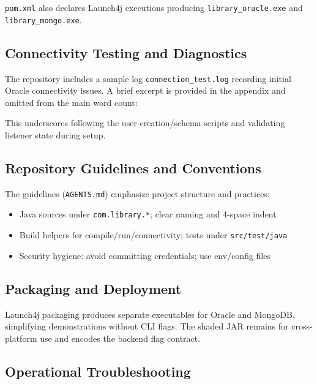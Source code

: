 \documentclass[12pt,a4paper]{article}
\newcommand{\code}[1]{\texttt{#1}}
\newcommand{\file}[1]{\texttt{#1}}
\begin{document}
\file{pom.xml} also declares Launch4j executions producing \code{library\_oracle.exe} and \code{library\_mongo.exe}.

\subsection{Connectivity Testing and Diagnostics}

The repository includes a sample log \file{connection\_test.log} recording initial Oracle connectivity issues. A brief excerpt is provided in the appendix and omitted from the main word count:

\begin{comment}
\begin{lstlisting}[style=java, caption=Oracle connectivity diagnostics]
ERROR:
ORA-01017: invalid username/password; logon denied

ERROR:
ORA-01005: null password given; logon denied
\end{lstlisting}
\end{comment}

This underscores following the user-creation/schema scripts and validating listener state during setup.

\subsection{Repository Guidelines and Conventions}

The guidelines (\file{AGENTS.md}) emphasize project structure and practices:
\begin{itemize}
    \item Java sources under \code{com.library.*}; clear naming and 4-space indent
    \item Build helpers for compile/run/connectivity; tests under \code{src/test/java}
    \item Security hygiene: avoid committing credentials; use env/config files
\end{itemize}

\subsection{Packaging and Deployment}

Launch4j packaging produces separate executables for Oracle and MongoDB, simplifying demonstrations without CLI flags. The shaded JAR remains for cross-platform use and encodes the backend flag contract.

\subsection{Operational Troubleshooting}
\end{document}
